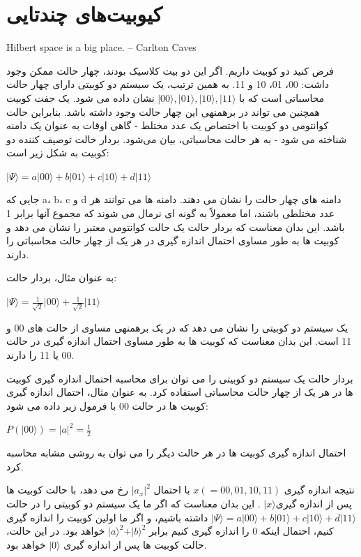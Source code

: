 \documentclass{book}
\begin{document}
\section{کیوبیت‌های چندتایی}
Hilbert space is a big place.
– Carlton Caves



فرض کنید دو کوبیت داریم. اگر این دو بیت کلاسیک بودند، چهار حالت ممکن وجود داشت: 00، 01، 10 و 11. به همین ترتیب، یک سیستم دو کوبیتی دارای چهار حالت محاسباتی است که با $\vert 00 \rangle, \vert 01 \rangle, \vert 10 \rangle, \vert 11 \rangle$ نشان داده می شود. یک جفت کوبیت همچنین می تواند در برهمنهی این چهار حالت وجود داشته باشد.
بنابراین حالت کوانتومی دو کوبیت با اختصاص یک عدد مختلط - گاهی اوقات به عنوان یک دامنه شناخته می شود - به هر حالت محاسباتی، بیان می‌شود. بردار حالت توصیف کننده دو کوبیت به شکل زیر است:
\begin{center}
	$\vert \Psi \rangle = a \vert00\rangle + b \vert01\rangle + c \vert10\rangle + d \vert11\rangle $
\end{center}

جایی که a، b، c و d دامنه های چهار حالت را نشان می دهند. دامنه ها می توانند هر عدد مختلطی باشند، اما معمولاً به گونه ای نرمال می شوند که مجموع آنها برابر 1 باشد. این بدان معناست که بردار حالت یک حالت کوانتومی معتبر را نشان می دهد و کوبیت ها به طور مساوی احتمال اندازه گیری در هر یک از چهار حالت محاسباتی را دارند.

به عنوان مثال، بردار حالت:

\begin{center}
$\vert \Psi \rangle = \frac{1}{\sqrt{2}} \vert00\rangle + \frac{1}{\sqrt{2}} \vert11\rangle$	
\end{center}

یک سیستم دو کوبیتی را نشان می دهد که در یک برهمنهی مساوی از حالت های 00 و 11 است. این بدان معناست که کوبیت ها به طور مساوی احتمال اندازه گیری در حالت 00 یا 11 را دارند.

بردار حالت یک سیستم دو کوبیتی را می توان برای محاسبه احتمال اندازه گیری کوبیت ها در هر یک از چهار حالت محاسباتی استفاده کرد. به عنوان مثال، احتمال اندازه گیری کوبیت ها در حالت 00 با فرمول زیر داده می شود:
\begin{center}
$P(\vert00\rangle) = \vert a\vert^ 2 = \frac{1}{2}$
\end{center}


احتمال اندازه گیری کوبیت ها در هر حالت دیگر را می توان به روشی مشابه محاسبه کرد.

نتیجه اندازه گیری $x (= 00, 01, 10 , 11)$ با احتمال $\vert a_{x} \vert ^ 2$ رخ می دهد، با حالت کوبیت ها پس از اندازه گیری$\vert x \rangle$ . این بدان معناست که اگر ما یک سیستم دو کوبیتی را در حالت
$\vert \Psi \rangle = a \vert00\rangle + b \vert01\rangle + c \vert10\rangle + d \vert11\rangle $ داشته باشیم، و اگر ما اولین کوبیت را اندازه گیری کنیم، احتمال اینکه 0 را اندازه گیری کنیم برابر $\vert a \rangle^2 + \vert b \rangle ^ 2$ خواهد بود. در این حالت، حالت کوبیت ها پس از اندازه گیری $\vert 0 \rangle$ خواهد بود.
\end{document}
